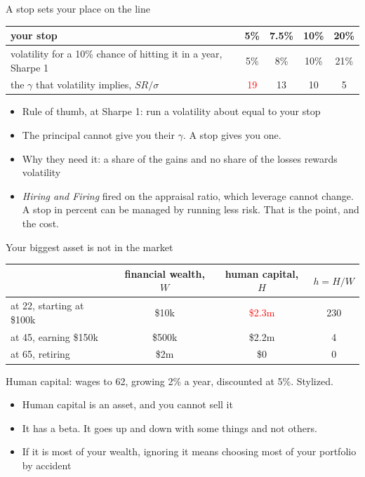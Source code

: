 \documentclass[aspectratio=169,10pt]{beamer}
\begin{document}
\begin{frame}{A stop sets your place on the line}
\vskip 2pt
\begin{center}
\renewcommand{\arraystretch}{1.3}
\begin{tabular}{lcccc}
\toprule
your stop & 5\% & 7.5\% & 10\% & 20\% \\
\midrule
volatility for a 10\% chance of hitting it in a year, Sharpe 1 & 5\% & 8\% & 10\% & 21\% \\
the $\gamma$ that volatility implies, $SR/\sigma$ & \textcolor{red}{19} & 13 & 10 & 5 \\
\bottomrule
\end{tabular}
\end{center}
\vskip 8pt
\begin{itemize}
\item Rule of thumb, at Sharpe 1: run a volatility about equal to your stop
\vskip 6pt
\item The principal cannot give you their $\gamma$. A stop gives you one.
\vskip 6pt
\item Why they need it: a share of the gains and no share of the losses rewards volatility
\vskip 6pt
\item \emph{Hiring and Firing} fired on the appraisal ratio, which leverage cannot change. A stop in percent can be managed by running less risk. That is the point, and the cost.
\end{itemize}
\end{frame}

\begin{frame}{Your biggest asset is not in the market}
\vskip 4pt
\begin{center}
\renewcommand{\arraystretch}{1.35}
\begin{tabular}{lccc}
\toprule
 & financial wealth, $W$ & human capital, $H$ & $h = H/W$ \\
\midrule
at 22, starting at \$100k & \$10k & \textcolor{red}{\$2.3m} & 230 \\
at 45, earning \$150k & \$500k & \$2.2m & 4 \\
at 65, retiring & \$2m & \$0 & 0 \\
\bottomrule
\end{tabular}
\end{center}
{\small Human capital: wages to 62, growing 2\% a year, discounted at 5\%. Stylized.}
\vskip 10pt
\begin{itemize}
\item Human capital is an asset, and you cannot sell it
\vskip 6pt
\item It has a beta. It goes up and down with some things and not others.
\vskip 6pt
\item If it is most of your wealth, ignoring it means choosing most of your portfolio by accident
\end{itemize}
\end{frame}
\end{document}
